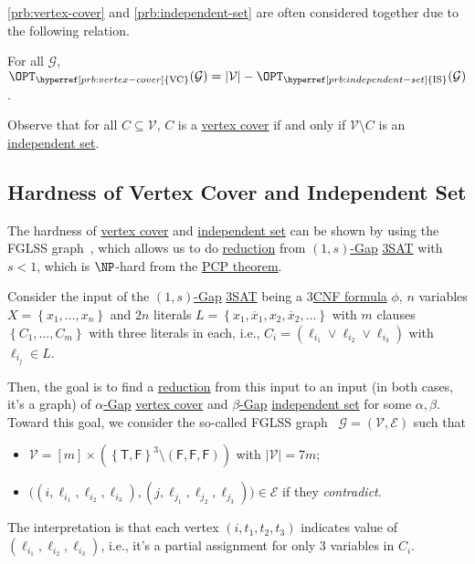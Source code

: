 \autoref{prb:vertex-cover} and \autoref{prb:independent-set} are often considered together due to the following relation.

\begin{claim}
	For all \(\mathcal{G} \), \(\OPT_{\hyperref[prb:vertex-cover]{\text{VC}}}(\mathcal{G} ) = \vert \mathcal{V} \vert - \OPT_{\hyperref[prb:independent-set]{\text{IS}}}(\mathcal{G} )\).
\end{claim}
\begin{explanation}
	Observe that for all \(C \subseteq \mathcal{V} \), \(C\) is a \hyperref[prb:vertex-cover]{vertex cover} if and only if \(\mathcal{V} \setminus C\) is an \hyperref[prb:independent-set]{independent set}.
\end{explanation}

\subsection{Hardness of Vertex Cover and Independent Set}
The hardness of \hyperref[prb:vertex-cover]{vertex cover} and \hyperref[prb:independent-set]{independent set} can be shown by using the FGLSS graph~\cite{10.1145/226643.226652}, which allows us to do \hyperref[def:reduction]{reduction} from \hyperref[def:c-s-Gap]{\((1, s)\)-Gap} \hyperref[prb:max-3SAT]{3SAT} with \(s < 1\), which is \(\NP\)-hard from the \hyperref[thm:PCP]{PCP theorem}.

Consider the input of the \hyperref[def:c-s-Gap]{\((1, s)\)-Gap} \hyperref[prb:max-3SAT]{3SAT} being a \hyperref[def:k-CNF]{\(3\)CNF formula} \(\phi \), \(n\) variables \(X=\left\{ x_1, \ldots , x_n\right\}\) and \(2n\) literals \(L = \left\{ x_1, \overline{x}_1, x_2, \overline{x}_2, \ldots \right\}\) with \(m\) clauses \(\left\{ C_1, \ldots , C_m \right\} \) with three literals in each, i.e., \(C_i = (\ell _{i_1} \lor \ell _{i_2} \lor \ell _{i_3}) \) with \(\ell _{i_j}\in L\).

Then, the goal is to find a \hyperref[def:reduction]{reduction} from this input to an input (in both cases, it's a graph) of \hyperref[def:Gap]{\(\alpha\)-Gap} \hyperref[prb:vertex-cover]{vertex cover} and \hyperref[def:Gap]{\(\beta \)-Gap} \hyperref[prb:independent-set]{independent set} for some \(\alpha , \beta \). Toward this goal, we consider the so-called FGLSS graph~\cite{10.1145/226643.226652} \(\mathcal{G} =(\mathcal{V} , \mathcal{E} )\) such that
\begin{itemize}
	\item \(\mathcal{V} = [m]\times \left( \left\{ \textsf{T}, \textsf{F} \right\} ^3 \setminus (\textsf{F}, \textsf{F}, \textsf{F}) \right)\) with \(\vert \mathcal{V}  \vert = 7m\);
	\item \(\big((i, \ell _{i_1}, \ell _{i_2}, \ell _{i_3}), (j, \ell _{j_1}, \ell _{j_2}, \ell _{j_3})\big)\in \mathcal{E} \) if they \emph{contradict}.
\end{itemize}
The interpretation is that each vertex \((i, t_1, t_2, t_3)\) indicates value of \((\ell _{i_1}, \ell _{i_2}, \ell _{i_3})\), i.e., it's a partial assignment for only \(3\) variables in \(C_i\).


